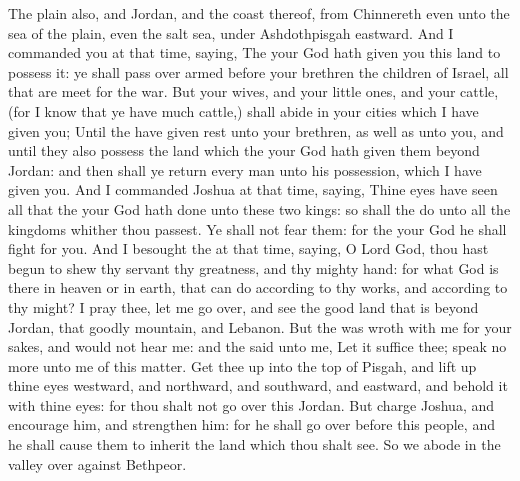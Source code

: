 \begin{biblechapter}
\verse The plain also, and Jordan, and the coast thereof, from Chinnereth even unto the sea of the plain, even the salt sea, under Ashdothpisgah eastward.
\verse And I commanded you at that time, saying, The \LORD your God hath given you this land to possess it: ye shall pass over armed before your brethren the children of Israel, all that are meet for the war.
\verse But your wives, and your little ones, and your cattle, (for I know that ye have much cattle,) shall abide in your cities which I have given you;
\verse Until the \LORD have given rest unto your brethren, as well as unto you, and until they also possess the land which the \LORD your God hath given them beyond Jordan: and then shall ye return every man unto his possession, which I have given you.
 And I commanded Joshua at that time, saying, Thine eyes have seen all that the \LORD your God hath done unto these two kings: so shall the \LORD do unto all the kingdoms whither thou passest.
\verse Ye shall not fear them: for the \LORD your God he shall fight for you.
\verse And I besought the \LORD at that time, saying,
\verse O Lord God, thou hast begun to shew thy servant thy greatness, and thy mighty hand: for what God is there in heaven or in earth, that can do according to thy works, and according to thy might?
\verse I pray thee, let me go over, and see the good land that is beyond Jordan, that goodly mountain, and Lebanon.
\verse But the \LORD was wroth with me for your sakes, and would not hear me: and the \LORD said unto me, Let it suffice thee; speak no more unto me of this matter.
\verse Get thee up into the top of Pisgah, and lift up thine eyes westward, and northward, and southward, and eastward, and behold it with thine eyes: for thou shalt not go over this Jordan.
\verse But charge Joshua, and encourage him, and strengthen him: for he shall go over before this people, and he shall cause them to inherit the land which thou shalt see.
\verse So we abode in the valley over against Bethpeor.
\end{biblechapter}

